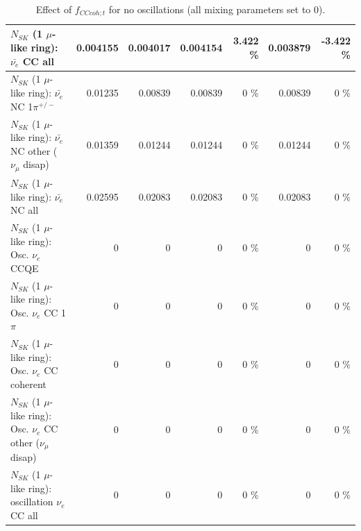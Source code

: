 \begin{table}
\begin{tabular}{| l | r | r | r  r | r  r |}
                            $N_{SK}$ (1 $\mu$-like ring): $\bar{\nu_{e}}$ CC all &        0.004155 &        0.004017 &        0.004154 &    3.422 \%  &        0.003879 &   -3.422 \%  \\ 
\hline
                     $N_{SK}$ (1 $\mu$-like ring): $\bar{\nu_e}$ NC 1$\pi^{+/-}$ &         0.01235 &         0.00839 &         0.00839 &        0 \%  &         0.00839 &        0 \%  \\ 
          $N_{SK}$ (1 $\mu$-like ring): $\bar{\nu_e}$ NC other ($\nu_\mu$ disap) &         0.01359 &         0.01244 &         0.01244 &        0 \%  &         0.01244 &        0 \%  \\ 
                            $N_{SK}$ (1 $\mu$-like ring): $\bar{\nu_{e}}$ NC all &         0.02595 &         0.02083 &         0.02083 &        0 \%  &         0.02083 &        0 \%  \\ 
\hline
\hline
\hline
                                 $N_{SK}$ (1 $\mu$-like ring): Osc. $\nu_e$ CCQE &               0 &               0 &               0 &        0 \%  &               0 &        0 \%  \\ 
                            $N_{SK}$ (1 $\mu$-like ring): Osc. $\nu_e$ CC 1$\pi$ &               0 &               0 &               0 &        0 \%  &               0 &        0 \%  \\ 
                          $N_{SK}$ (1 $\mu$-like ring): Osc. $\nu_e$ CC coherent &               0 &               0 &               0 &        0 \%  &               0 &        0 \%  \\ 
           $N_{SK}$ (1 $\mu$-like ring): Osc. $\nu_e$ CC other ($\nu_\mu$ disap) &               0 &               0 &               0 &        0 \%  &               0 &        0 \%  \\ 
                        $N_{SK}$ (1 $\mu$-like ring): oscillation $\nu_e$ CC all &               0 &               0 &               0 &        0 \%  &               0 &        0 \%  \\ 
\hline
\hline
\end{tabular}
\caption{ Effect of $f_{CCcoh; t}$ for no oscillations (all mixing parameters set to 0). }
\label{tab:num_xsec_norm_cccoh_1RmuT_3f_osc_t13:0}
\end{table}
\clearpage
